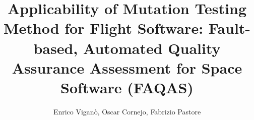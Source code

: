 \documentclass[acmsmall,nonacm]{acmart}
\begin{document}
\title[]{Applicability of Mutation Testing Method for Flight Software: Fault-based, Automated Quality Assurance Assessment for Space Software (FAQAS)}
\renewcommand{\shortauthors}{}

\author{Enrico Viganò, Oscar Cornejo, Fabrizio Pastore}

%
%
%

\end{document}

